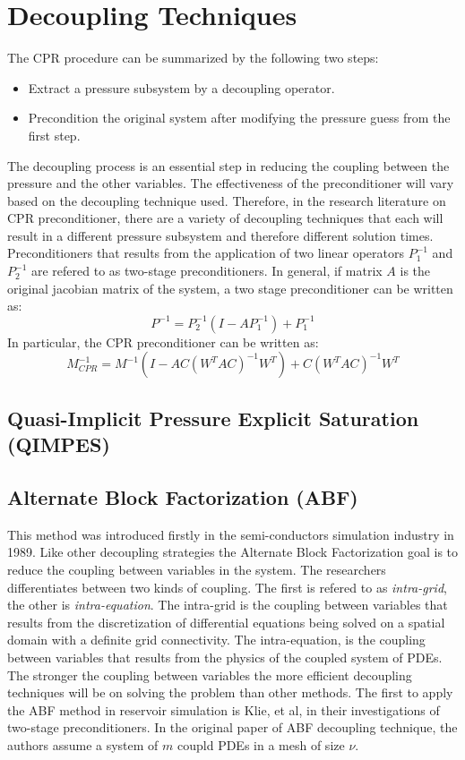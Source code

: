 \section{Decoupling Techniques}
The CPR procedure can be summarized by the following two steps:
\begin{itemize}
	\item Extract a pressure subsystem by a decoupling operator.
	\item Precondition the original system after modifying the pressure guess from the first step.
\end{itemize}
The decoupling process is an essential step in reducing the coupling between the pressure and the other variables.
The effectiveness of the preconditioner will vary based on the decoupling technique used. Therefore, in the research
literature on CPR preconditioner, there are a variety of decoupling techniques that each will result in a different pressure
subsystem and therefore different solution times. Preconditioners that results from the application of two linear operators
$P_{1}^{-1}$ and $P_{2}^{-1}$ are refered to as two-stage preconditioners. In general, if matrix $A$ is the original jacobian
matrix of the system, a two stage preconditioner can be written as:
\begin{equation}
	P^{-1} = P_{2}^{-1}(I-AP_{1}^{-1}) + P_{1}^{-1}
\end{equation}
In particular, the CPR preconditioner can be written as:
\begin{equation}
	M_{CPR}^{-1} = M^{-1}(I - AC(W^{T}AC)^{-1}W^{T}) + C(W^{T}AC)^{-1}W^{T}
\end{equation}


\subsection{Quasi-Implicit Pressure Explicit Saturation (QIMPES)}

\subsection{Alternate Block Factorization (ABF)}
This method was introduced firstly in the semi-conductors simulation industry in 1989\supercite{Bank1989}. Like other decoupling strategies the
Alternate Block Factorization goal is to reduce the coupling between variables in the system. The researchers differentiates between two kinds
of coupling. The first is refered to as \textit{intra-grid}, the other is \textit{intra-equation}. The intra-grid is the coupling between 
variables that results from the discretization of differential equations being solved on a spatial domain with a definite grid connectivity.
The intra-equation, is the coupling between variables that results from the physics of the coupled system of PDEs.
The stronger the coupling between variables the more efficient decoupling techniques will be on solving the problem than other methods.
The first to apply the ABF method in reservoir simulation is Klie, et al\supercite{klie}, in their investigations of two-stage preconditioners. 
In the original paper of ABF decoupling technique, the authors assume a system of $m$ coupld PDEs in a mesh of size $\nu$.

